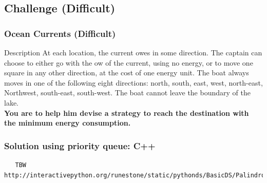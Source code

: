 \documentclass{beamer}
\begin{document}
\subsection{Challenge (Difficult)}
\begin{frame}
\frametitle{Ocean Currents (Difficult)}

\begin{block}{Description}
At each location, the current  owes in some direction. The captain can choose to either go with the
 ow of the current, using no energy, or to move one square in any other direction, at the cost of one
energy unit. The boat always moves in one of the following eight directions: north, south, east, west,
north-east, Northwest, south-east, south-west. The boat cannot leave the boundary of the lake.\\

\textbf{You are to help him devise a strategy to reach the destination with the minimum energy consumption.}
\end{block}

\end{frame}
\begin{frame}[fragile]
\frametitle{ Solution using priority queue: C++ }
\begin{example}[ C++ Implementation ]
\begin{lstlisting}
   TBW http://interactivepython.org/runestone/static/pythonds/BasicDS/PalindromeChecker.html
\end{lstlisting}
\end{example}
\end{frame}
\end{document}
